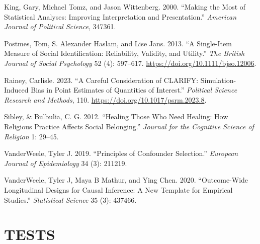 \documentclass[
  singlecolumn]{report}
\newlength{\cslhangindent}
\newlength{\cslentryspacingunit} %
\newenvironment{CSLReferences}[2] %
 {%
  \setlength{\parindent}{0pt}
  \ifodd #1
  \let\oldpar\par
  \def\par{\hangindent=\cslhangindent\oldpar}
  \fi
  \setlength{\parskip}{#2\cslentryspacingunit}
 }%
 {}
\begin{document}
\begin{CSLReferences}{1}{0}
\leavevmode{}%
King, Gary, Michael Tomz, and Jason Wittenberg. 2000. {``Making the Most
of Statistical Analyses: Improving Interpretation and Presentation.''}
\emph{American Journal of Political Science}, 347361.

\leavevmode{}%
Postmes, Tom, S. Alexander Haslam, and Lise Jans. 2013. {``A Single-Item
Measure of Social Identification: Reliability, Validity, and Utility.''}
\emph{The British Journal of Social Psychology} 52 (4): 597--617.
\url{https://doi.org/10.1111/bjso.12006}.

\leavevmode{}%
Rainey, Carlisle. 2023. {``A Careful Consideration of CLARIFY:
Simulation-Induced Bias in Point Estimates of Quantities of Interest.''}
\emph{Political Science Research and Methods}, 110.
\url{https://doi.org/10.1017/psrm.2023.8}.

\leavevmode{}%
Sibley, \& Bulbulia, C. G. 2012. {``Healing Those Who Need Healing: How
Religious Practice Affects Social Belonging.''} \emph{Journal for the
Cognitive Science of Religion} 1: 29--45.

\leavevmode{}%
VanderWeele, Tyler J. 2019. {``Principles of Confounder Selection.''}
\emph{European Journal of Epidemiology} 34 (3): 211219.

\leavevmode{}%
VanderWeele, Tyler J, Maya B Mathur, and Ying Chen. 2020.
{``Outcome-Wide Longitudinal Designs for Causal Inference: A New
Template for Empirical Studies.''} \emph{Statistical Science} 35 (3):
437466.

\end{CSLReferences}

\hypertarget{tests}{%
\section{TESTS}\label{tests}}
\end{document}
